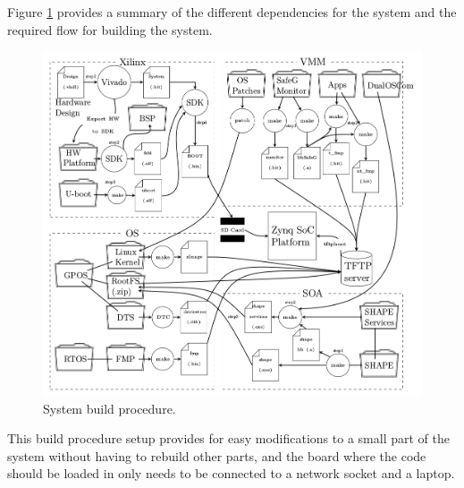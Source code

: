 Figure \ref{fig:system_build} provides a summary of the different dependencies for the system and the required flow for building the system.


\begin{figure}[H]
\centering
\includegraphics[width=\textwidth]{./img/literature_build.png}
\caption{System build procedure.\cite{zaki2016}}\label{fig:system_build}
\end{figure}


This build procedure setup provides for easy modifications to a small part of the system without having to rebuild other parts, and the board where the code should be loaded in only needs to be connected to a network socket and a laptop.
